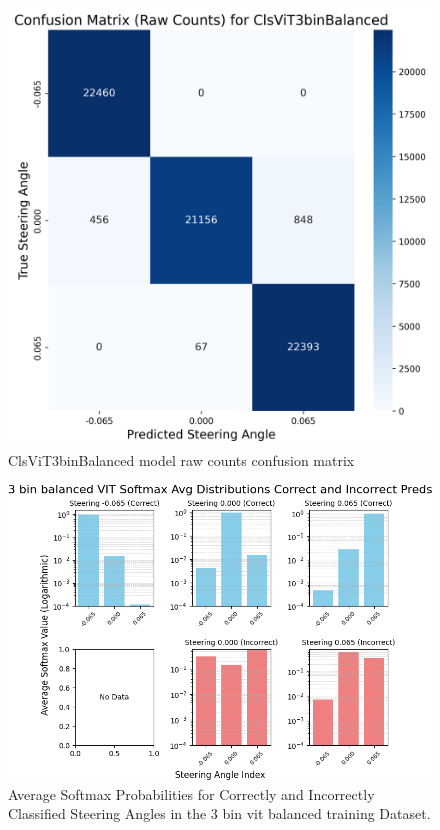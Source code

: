\begin{figure}[H]
\centering
\includegraphics[width=0.65\linewidth]{Figures/Results/cm_raw_ClsViT3binBalanced.png}
\caption{ClsViT3binBalanced model raw counts confusion matrix}
\label{fig:cm_raw_ClsViT3binBalanced}
\end{figure}

\begin{figure}[H]
    \centering
    \includegraphics[width=1\linewidth]{Figures/Results/3_bins_vit_softmax_dist_plot_balanced.png}
    \caption{Average Softmax Probabilities for Correctly and Incorrectly Classified Steering Angles in the 3 bin vit balanced training Dataset.}
    \label{fig:3_bins_vit_softmax_dist_balanced}
\end{figure}


